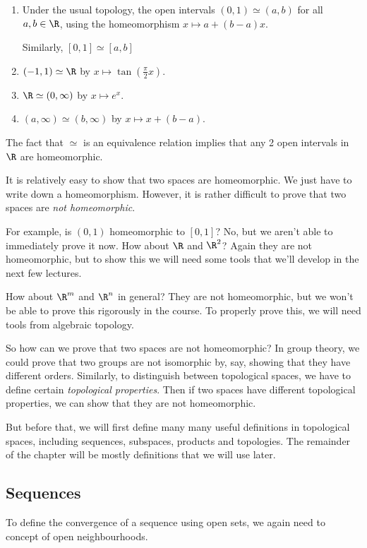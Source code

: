 \documentclass[a4paper]{article}
\begin{document}
\begin{eg}\leavevmode
  \begin{enumerate}
    \item Under the usual topology, the open intervals $(0, 1)\simeq (a, b)$ for all $a, b\in \R$, using the homeomorphism $x\mapsto a + (b - a)x$.

      Similarly, $[0, 1] \simeq [a, b]$
    \item $(-1, 1) \simeq \R$ by $x\mapsto \tan(\frac{\pi}{2}x)$.
    \item $\R\simeq (0, \infty)$ by $x\mapsto e^x$.
    \item $(a, \infty)\simeq (b, \infty)$ by $x\mapsto x + (b - a)$.
  \end{enumerate}
  The fact that $\simeq$ is an equivalence relation implies that any 2 open intervals in $\R$ are homeomorphic.

\end{eg}
It is relatively easy to show that two spaces are homeomorphic. We just have to write down a homeomorphism. However, it is rather difficult to prove that two spaces are \emph{not homeomorphic}.

For example, is $(0, 1)$ homeomorphic to $[0, 1]$? No, but we aren't able to immediately prove it now. How about $\R$ and $\R^2$? Again they are not homeomorphic, but to show this we will need some tools that we'll develop in the next few lectures.

How about $\R^m$ and $\R^n$ in general? They are not homeomorphic, but we won't be able to prove this rigorously in the course. To properly prove this, we will need tools from algebraic topology.

So how can we prove that two spaces are not homeomorphic? In group theory, we could prove that two groups are not isomorphic by, say, showing that they have different orders. Similarly, to distinguish between topological spaces, we have to define certain \emph{topological properties}. Then if two spaces have different topological properties, we can show that they are not homeomorphic.

But before that, we will first define many many useful definitions in topological spaces, including sequences, subspaces, products and topologies. The remainder of the chapter will be mostly definitions that we will use later.
\subsection{Sequences}
To define the convergence of a sequence using open sets, we again need to concept of open neighbourhoods.
\end{document}

